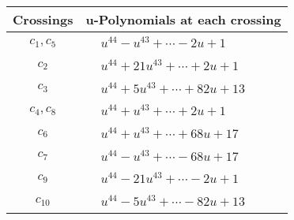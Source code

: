 \documentclass[1p]{elsarticle_modified}
\theoremstyle{definition}
\begin{document}
\begin{tabular}{m{50pt}|m{274pt}}
Crossings & \hspace{64pt}u-Polynomials at each crossing \\
\hline $$\begin{aligned}c_{1},c_{5}\end{aligned}$$&$\begin{aligned}
&u^{44}- u^{43}+\cdots-2 u+1
\end{aligned}$\\
\hline $$\begin{aligned}c_{2}\end{aligned}$$&$\begin{aligned}
&u^{44}+21 u^{43}+\cdots+2 u+1
\end{aligned}$\\
\hline $$\begin{aligned}c_{3}\end{aligned}$$&$\begin{aligned}
&u^{44}+5 u^{43}+\cdots+82 u+13
\end{aligned}$\\
\hline $$\begin{aligned}c_{4},c_{8}\end{aligned}$$&$\begin{aligned}
&u^{44}+u^{43}+\cdots+2 u+1
\end{aligned}$\\
\hline $$\begin{aligned}c_{6}\end{aligned}$$&$\begin{aligned}
&u^{44}+u^{43}+\cdots+68 u+17
\end{aligned}$\\
\hline $$\begin{aligned}c_{7}\end{aligned}$$&$\begin{aligned}
&u^{44}- u^{43}+\cdots-68 u+17
\end{aligned}$\\
\hline $$\begin{aligned}c_{9}\end{aligned}$$&$\begin{aligned}
&u^{44}-21 u^{43}+\cdots-2 u+1
\end{aligned}$\\
\hline $$\begin{aligned}c_{10}\end{aligned}$$&$\begin{aligned}
&u^{44}-5 u^{43}+\cdots-82 u+13
\end{aligned}$\\
\hline
\end{tabular}\newpage\renewcommand{\arraystretch}{1}
\end{document}
